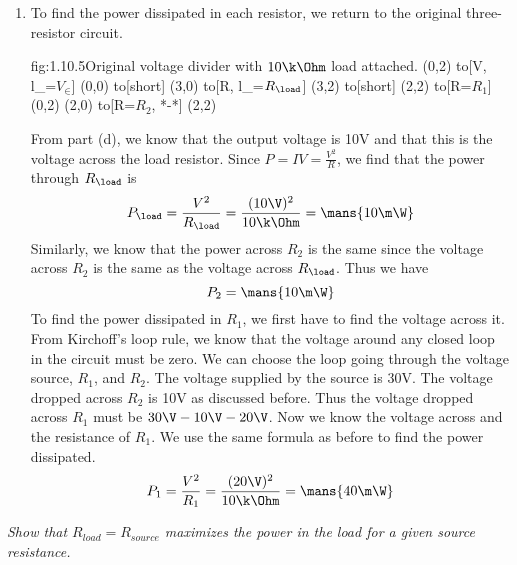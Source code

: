 \documentclass{article}
\begin{document}
\begin{enumerate}
        \item 
        To find the power dissipated in each resistor, we return to the original three-resistor circuit. 
        \begin{circuit}{fig:1.10.5}{Original voltage divider with $10\k\Ohm$ load attached.}
            (0,2) to[V, l_=$V_\in$] (0,0)
                to[short] (3,0)
                to[R, l_=$R_\load$] (3,2)
                to[short] (2,2)
                to[R=$R_1$] (0,2)
            (2,0) to[R=$R_2$, *-*] (2,2)
        \end{circuit}

        From part (d), we know that the output voltage is 10V and that this is the voltage across the load resistor. Since $P = IV = \frac{V^2}{R}$, we find that the power through $R_\load$ is 
        \[P_\load = \frac{V^2}{R_\load} = \frac{(10\V)^2}{10\k\Ohm} = \mans{10\m\W}\]
        Similarly, we know that the power across $R_2$ is the same since the voltage across $R_2$ is the same as the voltage across $R_\load$. Thus we have
        \[P_2 = \mans{10\m\W}\]
        To find the power dissipated in $R_1$, we first have to find the voltage across it. From Kirchoff's loop rule, we know that the voltage around any closed loop in the circuit must be zero. We can choose the loop going through the voltage source, $R_1$, and $R_2$. The voltage supplied by the source is 30V. The voltage dropped across $R_2$ is 10V as discussed before. Thus the voltage dropped across $R_1$ must be $30\V - 10\V - 20\V$. Now we know the voltage across and the resistance of $R_1$. We use the same formula as before to find the power dissipated.
        \[P_1 = \frac{V^2}{R_1} = \frac{(20\V)^2}{10\k\Ohm} = \mans{40\m\W}\]
    \end{enumerate}

    \textit{Show that $R_{load} = R_{source}$ maximizes the power in the load for a given source resistance.}\\
\end{document}

